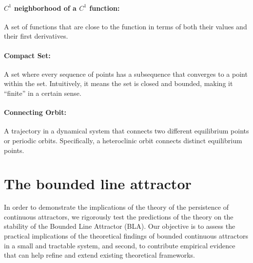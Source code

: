 \documentclass{article} %
\newcommand{\ascomment}[1]{\textcolor{ascolor}{(#1)}}
\newcounter{ct}
\theoremstyle{definition}
\theoremstyle{remark}
\begin{document}
\paragraph{\(C^{1}\) neighborhood of a \(C^{1}\) function:} A set of functions that are close to the function in terms of both their values and their first derivatives.\label{sec:supp:c1neighborhood}
\paragraph{Compact Set:} A set where every sequence of points has a subsequence that converges to a point within the set. Intuitively, it means the set is closed and bounded, making it ``finite'' in a certain sense.\label{sec:supp:compactset}
\paragraph{Connecting Orbit:} A trajectory in a dynamical system that connects two different equilibrium points or periodic orbits.
 Specifically, a heteroclinic orbit connects distinct equilibrium points.\label{sec:supp:connectingorbits}





\newpage
\section{The bounded line attractor}\label{sec:supp:bla}
In order to demonstrate the implications of the theory of the persistence of  continuous attractors, we rigorously test the predictions of the theory on the stability of the Bounded Line Attractor (BLA).
Our objective is to assess the practical implications of the theoretical findings of bounded continuous attractors in a small and tractable system, and second, to contribute empirical evidence that can help refine and extend existing theoretical frameworks.
\end{document}

